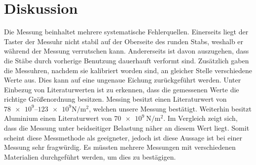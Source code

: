 \section{Diskussion}
Die Messung beinhaltet mehrere systematische Fehlerquellen.
Einerseits liegt der Taster der Messuhr nicht stabil auf der Oberseite des runden Stabs, weshalb er während der Messung verrutschen kann.
Andererseits ist davon auszugehen, dass die Stäbe durch vorherige Benutzung dauerhauft verformt sind.
Zusätzlich gaben die Messuhren, nachdem sie kalibriert worden sind, an gleicher Stelle 
verschiedene Werte aus.
Dies kann auf eine ungenaue Eichung zurückgeführt werden.
Unter Einbezug von Literaturwerten ist zu erkennen, dass die gemessenen Werte die richtige 
Größenordnung besitzen.
Messing besitzt einen Literaturwert von 
\mbox{$\num{78e9}$--$\num{123e9}\si{\newton\per\meter\squared}$\cite{lit_wert}}, welchen unsere 
Messung bestätigt.
Weiterhin besitzt Aluminium einen Literaturwert von 
$\SI{70e9}{\newton\per\meter\squared}$\cite{lit_wert}.
Im Vergleich zeigt sich, dass die Messung unter beidseitiger Belastung näher an diesem Wert liegt.
Somit scheint diese Messmethode als geeigneter, jedoch ist diese Aussage ist bei einer Messung 
sehr fragwürdig.
Es müssten mehrere Messungen mit verschiedenen Materialien durchgeführt werden, um dies zu bestägigen.
